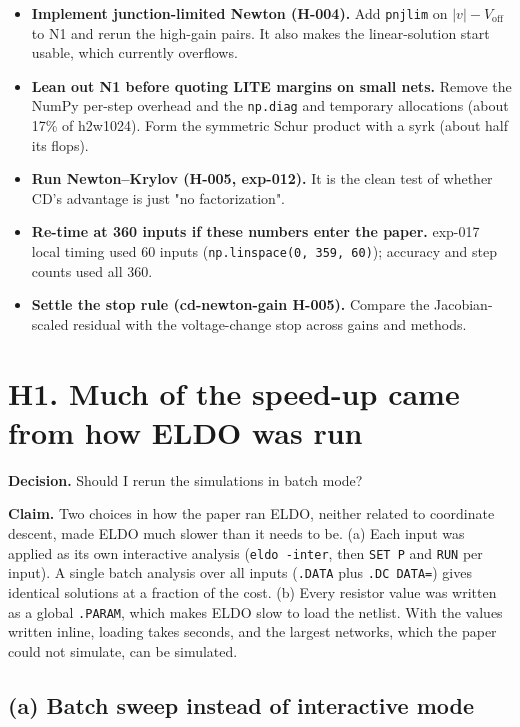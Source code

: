 \documentclass[11pt,a4paper]{article}
\newcommand{\claim}[1]{\par\noindent\textbf{Claim.} #1\par}
\newcommand{\decision}[1]{\par\noindent\textbf{Decision.} #1\par}
\begin{document}
\begin{itemize}
\item[$\square$] \textbf{Implement junction-limited Newton (H-004).} Add \nolinkurl{pnjlim} on
$|v|-V_{\mathrm{off}}$ to N1 and rerun the high-gain pairs. It also makes the
linear-solution start usable, which currently overflows.
\item[$\square$] \textbf{Lean out N1 before quoting LITE margins on small nets.} Remove the NumPy
per-step overhead and the \nolinkurl{np.diag} and temporary allocations (about 17\% of
h2w1024). Form the symmetric Schur product with a syrk (about half its flops).
\item[$\square$] \textbf{Run Newton--Krylov (H-005, exp-012).} It is the clean test of whether CD's
advantage is just "no factorization".
\item[$\square$] \textbf{Re-time at 360 inputs if these numbers enter the paper.} exp-017 local timing
used 60 inputs (\nolinkurl{np.linspace(0, 359, 60)}); accuracy and step counts used all
360.
\item[$\square$] \textbf{Settle the stop rule (cd-newton-gain H-005).} Compare the Jacobian-scaled
residual with the voltage-change stop across gains and methods.
\end{itemize}


\clearpage

\section*{H1. Much of the speed-up came from how ELDO was run}

\decision{Should I rerun the simulations in batch mode?}

\claim{Two choices in how the paper ran ELDO, neither related to coordinate
descent, made ELDO much slower than it needs to be. (a) Each input was
applied as its own interactive analysis (\texttt{eldo -inter}, then
\texttt{SET P} and \texttt{RUN} per input). A single batch analysis over
all inputs (\texttt{.DATA} plus \texttt{.DC DATA=}) gives identical
solutions at a fraction of the cost. (b) Every resistor value was written
as a global \texttt{.PARAM}, which makes ELDO slow to load the netlist.
With the values written inline, loading takes seconds, and the largest
networks, which the paper could not simulate, can be simulated.}

\subsection*{(a) Batch sweep instead of interactive mode}
\end{document}
